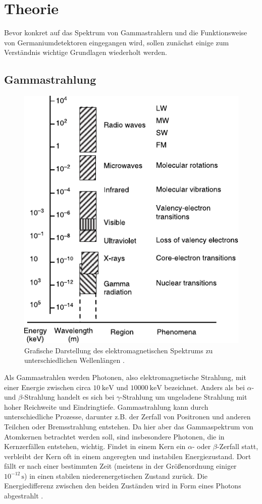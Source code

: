 \section{Theorie}
\label{sec:Theorie}

Bevor konkret auf das Spektrum von Gammastrahlern und die Funktionsweise von Germaniumdetektoren eingegangen wird, sollen zunächst einige zum
Verständnis wichtige Grundlagen wiederholt werden.

\subsection{Gammastrahlung}

\begin{figure}
    \centering
    \includegraphics{figures/light_energies.pdf}
    \caption{Grafische Darstellung des elektromagnetischen Spektrums zu unterschiedlichen Wellenlängen \cite{gamma}.}
    \label{fig:ems}
\end{figure}

Als Gammastrahlen werden Photonen, also elektromagnetische Strahlung, mit einer Energie zwischen circa $\SI{10}{\kilo\eV}$ und $\SI{10000}{\kilo\eV}$ bezeichnet.
Anders als bei $\alpha$- und $\beta$-Strahlung handelt es sich bei $\gamma$-Strahlung um ungeladene Strahlung mit hoher Reichweite und Eindringtiefe.
Gammastrahlung kann durch unterschiedliche Prozesse, darunter z.B. der Zerfall von Positronen und anderen Teilchen oder Bremsstrahlung entstehen.
Da hier aber das Gammaspektrum von Atomkernen betrachtet werden soll, sind insbesondere Photonen, die in Kernzerfällen entstehen, wichtig.
Findet in einem Kern ein $\alpha$- oder $\beta$-Zerfall statt, verbleibt der Kern oft in einem angeregten und instabilen Energiezustand.
Dort fällt er nach einer bestimmten Zeit (meistens in der Größenordnung einiger $10^{-12}\, \si{\second}$) in einen stabilen niederenergetischen Zustand zurück.
Die Energiedifferenz zwischen den beiden Zuständen wird in Form eines Photons abgestrahlt \cite{gamma}. \\

